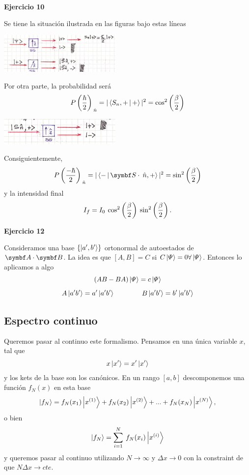 \documentclass[10pt,oneside]{CBFT_book}
\begin{document}
\begin{ejemplo}{\bf Ejercicio 10}

Se tiene la situación ilustrada en las figuras bajo estas líneas

\includegraphics[width=0.45\textwidth]{images/fig_ft2_ejercicio10A.jpg}

Por otra parte, la probabilidad será
\[
	P\left( \frac{ \hbar }{ 2 } \right)_{\:\hat{n}} = |\Braket{S_n,+|+}|^2 = \cos^2\left( \frac{ \beta }{ 2 } \right)
\]

\includegraphics[width=0.45\textwidth]{images/fig_ft2_ejercicio10B.jpg}

Consiguientemente,
\[
	P\Frac{-\hbar}{2}_{\nver} = |\Braket{-|\vb S\cdot\nver,+}|^2 = \sin^2\Frac{\b}{2}
\]
y la intensidad final
\[
	I_f = I_0 \: \cos^2\left( \frac{ \beta }{ 2 } \right) \: \sin^2\left( \frac{ \beta }{ 2 } \right).
\]
 
\end{ejemplo}



\begin{ejemplo}{\bf Ejercicio 12}
 
Consideramos una base $\{ \Ket{a',b'} \}$ ortonormal de autoestados de $\vb A\cdot \vb B$.
La idea es que $ [A,B] = C$ si $C\Ket{\Psi} = 0 \forall \Ket{\Psi}$.
Entonces lo aplicamos a algo
\[
	(AB - BA)\Ket{\Psi} = c\Ket{\Psi}
\]
\[
	A\Ket{a'b'} = a' \Ket{a'b'}  \qquad \qquad B\Ket{a'b'} = b' \Ket{a'b'}
\]
 
\end{ejemplo}

\subsection{Espectro continuo}

Queremos pasar al continuo este formalismo. Pensamos en una única variable $x$, tal que
\[
	x \Ket{x'} = x' \Ket{x'}
\]
y los kets de la base son los canónicos. En un rango $[a,b]$ descomponemos una función
$f_N(x)$ en esta base
\[
	\Ket{f_N} = f_N(x_1) \Ket{x^{(1)}} + f_N(x_2) \Ket{x^{(2)}} + ...
	+ f_N(x_N) \Ket{x^{(N)}},
\]
o bien
\[
	\Ket{f_N} = \sum_{i=1}^N \: f_N(x_i) \Ket{x^{(i)}}
\]
y queremos pasar al continuo utilizando $N \to \infty$ y $\Delta x \to 0$ con la constraint
de que $N\Delta x \to cte.$
\end{document}

